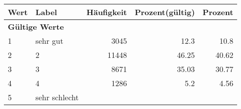      \begin{longtable}{lXrrr}
     \toprule
     \textbf{Wert} & \textbf{Label} & \textbf{Häufigkeit} & \textbf{Prozent(gültig)} & \textbf{Prozent} \\
     \endhead
     \midrule
     \multicolumn{5}{l}{\textbf{Gültige Werte}}\\

     1 &
     \multicolumn{1}{X}{ sehr gut   } &


       \num{3045} &
       \num[round-mode=places,round-precision=2]{12.3} &
         \num[round-mode=places,round-precision=2]{10.8} \\

     2 &
     \multicolumn{1}{X}{ 2   } &


       \num{11448} &
       \num[round-mode=places,round-precision=2]{46.25} &
         \num[round-mode=places,round-precision=2]{40.62} \\

     3 &
     \multicolumn{1}{X}{ 3   } &


       \num{8671} &
       \num[round-mode=places,round-precision=2]{35.03} &
         \num[round-mode=places,round-precision=2]{30.77} \\

     4 &
     \multicolumn{1}{X}{ 4   } &


       \num{1286} &
       \num[round-mode=places,round-precision=2]{5.2} &
         \num[round-mode=places,round-precision=2]{4.56} \\

     5 &
     \multicolumn{1}{X}{ sehr schlecht   } &



\end{longtable}
